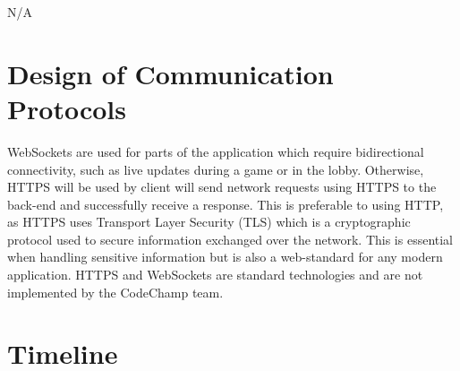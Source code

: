 \documentclass[12pt, titlepage]{article}
\begin{document}
N/A

\section{Design of Communication Protocols}

WebSockets are used for parts of the application which require bidirectional connectivity, such as live updates during a game or in the lobby. Otherwise, HTTPS will be used by client will send network requests using HTTPS to the back-end and successfully receive a response. This is preferable to using HTTP, as HTTPS uses Transport Layer Security (TLS) which is a cryptographic protocol used to secure information exchanged over the network. This is essential when handling sensitive information but is also a web-standard for any modern application. HTTPS and WebSockets are standard technologies and are not implemented by the CodeChamp team.

\section{Timeline}
\end{document}
